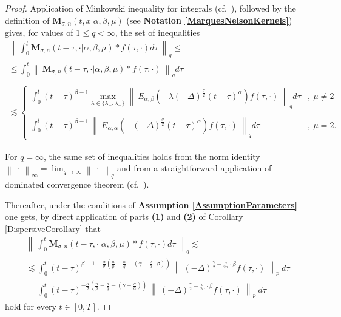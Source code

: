 \documentclass{amsart}
\theoremstyle{definition}
\theoremstyle{remark}
\numberwithin{equation}{section}
\begin{document}
		\begin{proof}
			Application of Minkowski inequality for integrals (cf.~\cite[Theorem 2.4]{LiebLoss01}), followed by the definition of ${\bm M}_{\sigma,n}(t,x|\alpha,\beta,\mu)$ (see {\bf Notation \ref{MarquesNelsonKernels}}) gives, for values of $1\leq q<\infty$, the set of inequalities
			\begin{eqnarray*}
				\left\|~\displaystyle \int_0^t {\bm M}_{\sigma,n}(t-\tau,\cdot|\alpha,\beta,\mu)\ast f(\tau,\cdot)d\tau~\right \|_q \leq \\
				\leq \int_0^t \left\|~\displaystyle {\bm M}_{\sigma,n}(t-\tau,\cdot|\alpha,\beta,\mu)\ast f(\tau,\cdot)~\right \|_q d\tau  \\ \ \\
				\lesssim \begin{cases}
					\displaystyle 	\int_0^t  (t-\tau)^{\beta-1} \max_{\lambda \in \{\lambda_+,\lambda_-\}} \left\|~E_{\alpha,\beta}(-\lambda(-\Delta)^{\frac{\sigma}{2}} (t-\tau)^{\alpha})f(\tau,\cdot)~\right\|_q d\tau &,~\mu\neq 2 \\ \ \\
					\displaystyle \int_0^t  (t-\tau)^{\beta-1}~\left\|~E_{\alpha,\alpha}(-(-\Delta)^{\frac{\sigma}{2}} (t-\tau)^\alpha)f(\tau,\cdot)~\right\|_qd\tau &,~\mu= 2.
				\end{cases}
			\end{eqnarray*}	
			
			For $q=\infty$, the same set of inequalities holds from the norm identity
			$\displaystyle \left\|~\displaystyle \cdot ~\right \|_\infty =\lim_{q\rightarrow\infty}\left\|~\displaystyle \cdot~\right \|_q$
			and from a straightforward application of dominated convergence theorem (cf.~\cite[Theorem 1.8]{LiebLoss01}).
			
			Thereafter, under the conditions of {\bf Assumption \ref{AssumptionParameters}} one gets, by direct application of parts {\bf (1)} and {\bf (2)} of Corollary \ref{DispersiveCorollary} that
			\begin{eqnarray*}
				\left\|~\displaystyle \int_0^t {\bm M}_{\sigma,n}(t-\tau,\cdot|\alpha,\beta,\mu)\ast  f(\tau,\cdot)d\tau~\right \|_q 
				\lesssim \nonumber \\
				\lesssim	\int_0^t (t-\tau)^{\beta-1-\frac{\alpha}{\sigma}\left(\frac{n}{p}-\frac{n}{q}-\left(\gamma-\frac{\sigma}{\alpha}\cdot\beta\right)\right)}~
				\left\|~(-\Delta)^{\frac{\gamma}{2}-\frac{\sigma}{2\alpha}\cdot\beta} f(\tau,\cdot)~\right\|_{p}~ d\tau \\
				=\int_0^t (t-\tau)^{-\frac{\alpha}{\sigma}\left(\frac{n}{p}-\frac{n}{q}-\left(\gamma-\frac{\sigma}{\alpha}\right)\right)}~
				\left\|~(-\Delta)^{\frac{\gamma}{2}-\frac{\sigma}{2\alpha}\cdot\beta} f(\tau,\cdot)~\right\|_{p}~ d\tau
			\end{eqnarray*}
			hold for every $t\in [0,T]$.
			

\end{proof}
\end{document}
